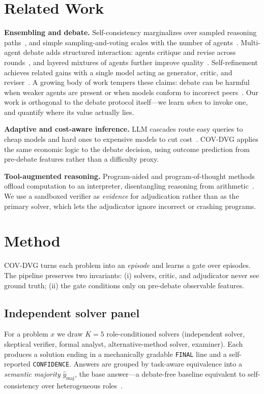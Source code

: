 \documentclass[conference]{IEEEtran}
\begin{document}
\section{Related Work}
\textbf{Ensembling and debate.} Self-consistency marginalizes over sampled reasoning
paths~\cite{wang2023selfcons}, and simple sampling-and-voting scales with the number
of agents~\cite{li2024moreagents}. Multi-agent debate adds structured interaction:
agents critique and revise across rounds~\cite{du2024debate,liang2024mad}, and
layered mixtures of agents further improve quality~\cite{wang2024moa}. Self-refinement
achieves related gains with a single model acting as generator, critic, and
reviser~\cite{madaan2023selfrefine}. A growing body of work tempers these claims:
debate can be harmful when weaker agents are present or when models conform to
incorrect peers~\cite{wynn2025failure}. Our work is orthogonal to the debate protocol
itself---we learn \emph{when} to invoke one, and quantify where its value actually
lies.

\textbf{Adaptive and cost-aware inference.} LLM cascades route easy queries to cheap
models and hard ones to expensive models to cut cost~\cite{chen2023frugalgpt}.
COV-DVG applies the same economic logic to the debate decision, using outcome
prediction from pre-debate features rather than a difficulty proxy.

\textbf{Tool-augmented reasoning.} Program-aided and program-of-thought methods
offload computation to an interpreter, disentangling reasoning from
arithmetic~\cite{gao2023pal,chen2023pot}. We use a sandboxed verifier as
\emph{evidence} for adjudication rather than as the primary solver, which lets the
adjudicator ignore incorrect or crashing programs.

\section{Method}
\label{sec:method}
COV-DVG turns each problem into an \emph{episode} and learns a gate over episodes.
The pipeline preserves two invariants: (i) solvers, critic, and adjudicator never see
ground truth; (ii) the gate conditions only on pre-debate observable features.

\subsection{Independent solver panel}
For a problem $x$ we draw $K{=}5$ role-conditioned solvers (independent solver,
skeptical verifier, formal analyst, alternative-method solver, examiner). Each
produces a solution ending in a mechanically gradable \texttt{FINAL} line and a
self-reported \texttt{CONFIDENCE}. Answers are grouped by task-aware equivalence into
a \emph{semantic majority} $\hat{y}_\text{maj}$, the base answer---a debate-free
baseline equivalent to self-consistency over heterogeneous roles~\cite{wang2023selfcons}.
\end{document}
